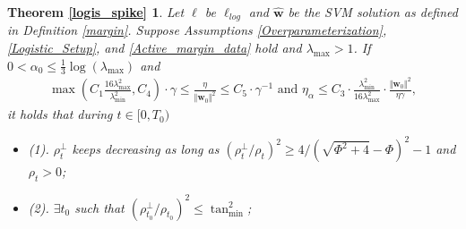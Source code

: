 \documentclass[pdflatex,sn-basic]{sn-jnl}%
\theoremstyle{thmstyleone}%
\begin{document}
\begin{appendices}
\newtheorem*{restate_logis_spike}{Theorem \ref{logis_spike}}
\begin{shaded}
\begin{restate_logis_spike}
  Let $\ell$ be $\ell_{log}$ and $\hat{\mathbf{w}}$ be the SVM solution as defined in Definition \ref{margin}. 
  Suppose Assumptions \ref{Overparameterization}, \ref{Logistic_Setup}, and \ref{Active_margin_data} hold and $\lambda_{\max} > 1$. If 
  $0 < \alpha_0 \le \frac{1}{3} \log \left( \lambda_{\max} \right)$ and 
  \begin{equation*}
  \begin{aligned}
    \max \left( 
      C_1 \frac{16 \lambda_{\max}^2  }{ \lambda_{\min}^2 }, 
      C_4
    \right)  \cdot \gamma
    \le \frac{\eta}{\Vert \mathbf{w}_0 \Vert^2} \le C_5 \cdot \gamma^{-1}
    \text{  and  }
    \eta_{\alpha} \le 
    C_3 \cdot \frac{\lambda_{\min}^2}{16\lambda_{\max}^2} \cdot \frac{\Vert \mathbf{w}_0 \Vert^2}{\eta \gamma}, 
  \end{aligned}
  \end{equation*}
  it holds that during $t \in [0, T_0)$
  \begin{itemize}
    \item (1). $\rho_t^{\perp}$ keeps decreasing as long as $\left( {\rho_t^{\perp}}/{\rho_t} \right)^2 \ge 
    {4}/{\left(\sqrt{ \Phi^2 + 4} - \Phi\right)^2} - 1$ and $\rho_t > 0$; 

    \item (2). $\exists t_0$ such that $\left(\rho_{t_0}^{\perp}/\rho_{t_0}\right)^2 \le 
    \tan_{\min}^2$; 
    

\end{itemize}
\end{restate_logis_spike}
\end{shaded}
\end{appendices}
\end{document}
